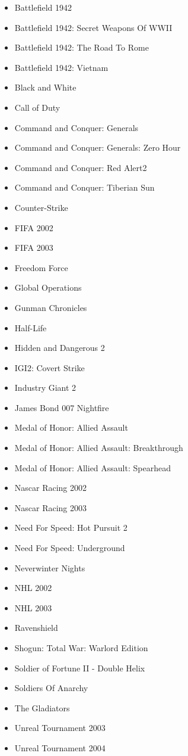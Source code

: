 \begin{itemize}
\item Battlefield 1942
\item Battlefield 1942: Secret Weapons Of WWII
\item Battlefield 1942: The Road To Rome
\item Battlefield 1942: Vietnam
\item Black and White
\item Call of Duty
\item Command and Conquer: Generals
\item Command and Conquer: Generals: Zero Hour
\item Command and Conquer: Red Alert2
\item Command and Conquer: Tiberian Sun
\item Counter-Strike
\item FIFA 2002
\item FIFA 2003
\item Freedom Force
\item Global Operations
\item Gunman Chronicles
\item Half-Life
\item Hidden and Dangerous 2
\item IGI2: Covert Strike
\item Industry Giant 2
\item James Bond 007 Nightfire
\item Medal of Honor: Allied Assault
\item Medal of Honor: Allied Assault: Breakthrough
\item Medal of Honor: Allied Assault: Spearhead
\item Nascar Racing 2002
\item Nascar Racing 2003
\item Need For Speed: Hot Pursuit 2
\item Need For Speed: Underground
\item Neverwinter Nights
\item NHL 2002
\item NHL 2003
\item Ravenshield
\item Shogun: Total War: Warlord Edition
\item Soldier of Fortune II - Double Helix
\item Soldiers Of Anarchy
\item The Gladiators
\item Unreal Tournament 2003
\item Unreal Tournament 2004
\end{itemize}

